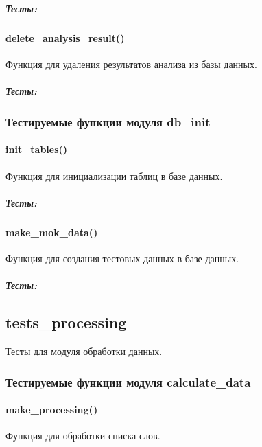 \documentclass[a4paper,11pt,russian,openany,oneside]{sphinxmanual}
\begin{document}
\subparagraph{Тесты:}
\label{\detokenize{tests_module:id16}}

\paragraph{delete\_analysis\_result()}
\label{\detokenize{tests_module:delete-analysis-result}}
\sphinxAtStartPar
Функция для удаления результатов анализа из базы данных.


\subparagraph{Тесты:}
\label{\detokenize{tests_module:id17}}

\subsubsection{Тестируемые функции модуля db\_init}
\label{\detokenize{tests_module:db-init}}

\paragraph{init\_tables()}
\label{\detokenize{tests_module:init-tables}}
\sphinxAtStartPar
Функция для инициализации таблиц в базе данных.


\subparagraph{Тесты:}
\label{\detokenize{tests_module:id18}}

\paragraph{make\_mok\_data()}
\label{\detokenize{tests_module:make-mok-data}}
\sphinxAtStartPar
Функция для создания тестовых данных в базе данных.


\subparagraph{Тесты:}
\label{\detokenize{tests_module:id19}}

\subsection{tests\_processing}
\label{\detokenize{tests_module:tests-processing}}
\sphinxAtStartPar
Тесты для модуля обработки данных.


\subsubsection{Тестируемые функции модуля calculate\_data}
\label{\detokenize{tests_module:calculate-data}}

\paragraph{make\_processing()}
\label{\detokenize{tests_module:make-processing}}
\sphinxAtStartPar
Функция для обработки списка слов.
\end{document}
